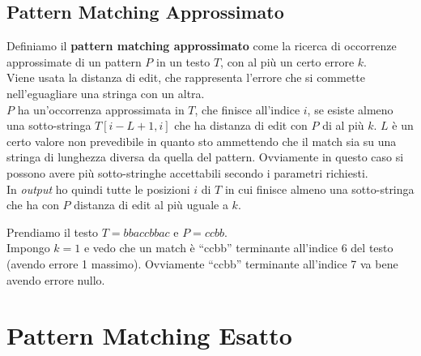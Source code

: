 \subsection{Pattern Matching Approssimato}
\begin{definizione}
  Definiamo il \textbf{pattern matching approssimato} come la ricerca di
  occorrenze approssimate di un pattern $P$ in un testo $T$, con al più un certo
  errore $k$.\\
  Viene usata la \textnormal{distanza di edit}, che rappresenta l'errore che si
  commette nell'eguagliare una stringa con un altra.\\
  $P$ ha un'occorrenza approssimata in $T$, che finisce all'indice $i$, se
  esiste almeno una sotto-stringa $T[i-L+1,i]$ che ha distanza di edit con $P$ di
  al più $k$. $L$ è un certo valore non prevedibile in quanto sto ammettendo che
  il match sia su una stringa di lunghezza diversa da quella del
  pattern. Ovviamente in questo caso si possono avere più sotto-stringhe
  accettabili secondo i parametri richiesti.\\
  In \textit{output} ho quindi tutte le posizioni $i$ di $T$ in cui finisce almeno una
  sotto-stringa che ha con $P$ distanza di edit al più uguale a $k$.
\end{definizione}
\begin{esempio}
  Prendiamo il testo $T=bbaccbbac$ e $P=ccbb$.\\
  Impongo $k=1$ e vedo che un match è ``ccbb'' terminante all'indice 6 del testo
  (avendo errore 1 massimo). Ovviamente ``ccbb'' terminante all'indice 7 va bene
  avendo errore nullo.\\
  
\end{esempio}
\section{Pattern Matching Esatto}

